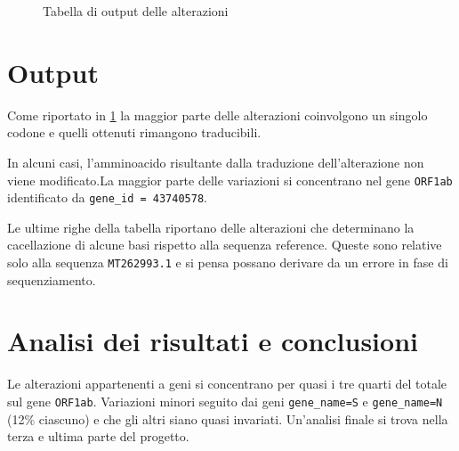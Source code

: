 \documentclass[11pt,italian]{article}
\begin{document}
\begin{figure}
  \caption{Tabella di output delle alterazioni}
  \label{fig:alteration_table}
\end{figure}

\newpage
\section{Output}
Come riportato in \cref{fig:alteration_table} la maggior parte delle alterazioni coinvolgono un singolo codone e quelli ottenuti rimangono traducibili.

In alcuni casi, l'amminoacido risultante dalla traduzione dell'alterazione non viene modificato.\hspace{1mm}La maggior parte delle variazioni si concentrano nel gene \lstinline{ORF1ab} identificato da \lstinline{gene_id = 43740578}.

Le ultime righe della tabella riportano delle alterazioni che determinano la cacellazione di alcune basi rispetto alla sequenza reference.
Queste sono relative solo alla sequenza \lstinline{MT262993.1} e si pensa possano derivare da un errore in fase di sequenziamento.


\section{Analisi dei risultati e conclusioni}
Le alterazioni appartenenti a geni si concentrano per quasi i tre quarti del totale sul gene \lstinline{ORF1ab}. Variazioni minori  seguito dai geni \lstinline{gene_name=S} e \lstinline{gene_name=N} (12\% ciascuno) e che gli altri siano quasi invariati.
Un'analisi finale si trova nella terza e ultima parte del progetto.
\end{document}

